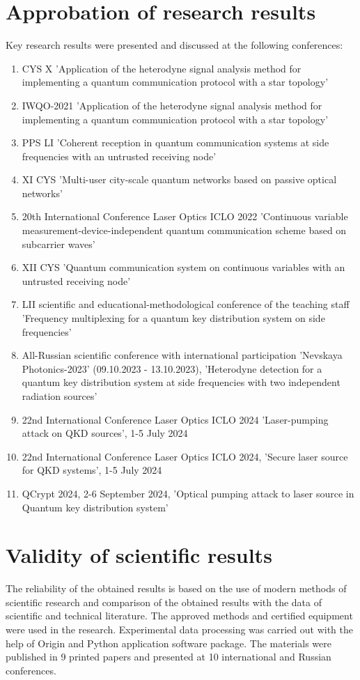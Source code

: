\section*{Approbation of research results}
Key research results were presented and discussed at the following conferences:
\begin{enumerate}
    \item CYS X 'Application of the heterodyne signal analysis method for implementing a quantum communication protocol with a star topology'
    \item IWQO-2021 'Application of the heterodyne signal analysis method for implementing a quantum communication protocol with a star topology'
    \item PPS LI 'Coherent reception in quantum communication systems at side frequencies with an untrusted receiving node'
    \item XI CYS 'Multi-user city-scale quantum networks based on passive optical networks'
    \item 20th International Conference Laser Optics ICLO 2022 'Continuous variable measurement-device-independent quantum communication scheme based on subcarrier waves'
    \item XII CYS 'Quantum communication system on continuous variables with an untrusted receiving node'
    \item LII scientific and educational-methodological conference of the teaching staff 'Frequency multiplexing for a quantum key distribution system on side frequencies'
    \item All-Russian scientific conference with international participation 'Nevskaya Photonics-2023' (09.10.2023 - 13.10.2023), 'Heterodyne detection for a quantum key distribution system at side frequencies with two independent radiation sources'
    \item 22nd International Conference Laser Optics ICLO 2024 'Laser-pumping attack on QKD sources', 1-5 July 2024
    \item 22nd International Conference Laser Optics ICLO 2024, 'Secure laser source for QKD systems', 1-5 July 2024
    \item QCrypt 2024, 2-6 September 2024, 'Optical pumping attack to laser source in Quantum key distribution system'
\end{enumerate}

\section*{Validity of scientific results}
The reliability of the obtained results is based on the use of modern methods of scientific research and comparison of the obtained results with the data of scientific and technical literature. The approved methods and certified equipment were used in the research. Experimental data processing was carried out with the help of Origin and Python application software package. The materials were published in 9 printed papers and presented at 10 international and Russian conferences.

